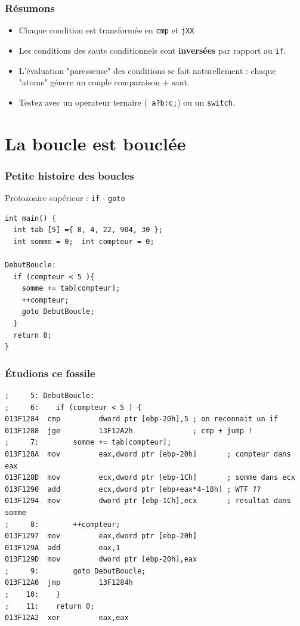 \documentclass{beamer}
\begin{document}
\begin{frame}
\frametitle{Résumons}
\begin{block}{}
\begin{itemize}
\item Chaque condition est transformée en \texttt{cmp} et \texttt{jXX}
\item Les conditions des sauts conditionnels sont \textbf{inversées} par rapport au \texttt{if}.
\item L'évaluation "paresseuse" des conditions se fait naturellement : chaque "atome" génere un couple comparaison + saut.
\item Testez avec un operateur ternaire (\texttt{ a?b:c;}) ou un \lstinline+switch+.
\end{itemize}
\end{block}

\end{frame}



\section{La boucle est bouclée}
\begin{frame}[fragile]
\frametitle{Petite histoire des boucles}
Protozoaire supérieur : \lstinline+if+ - \lstinline+goto+
\begin{lstlisting}
int main() {
  int tab [5] ={ 8, 4, 22, 904, 30 };
  int somme = 0;  int compteur = 0;

DebutBoucle:
  if (compteur < 5 ){
    somme += tab[compteur];
    ++compteur;
    goto DebutBoucle;
  }
  return 0;
}
\end{lstlisting}
\end{frame}

\begin{frame}[fragile]
\frametitle{Étudions ce fossile}
\begin{lstlisting}[language={[x86masm]Assembler}, basicstyle={\scriptsize\ttfamily}]
;     5: DebutBoucle:
;     6: 	if (compteur < 5 ) {
013F1284  cmp         dword ptr [ebp-20h],5 ; on reconnait un if
013F1288  jge         13F12A2h              ; cmp + jump !
;     7: 		somme += tab[compteur];
013F128A  mov         eax,dword ptr [ebp-20h]       ; compteur dans eax
013F128D  mov         ecx,dword ptr [ebp-1Ch]       ; somme dans ecx
013F1290  add         ecx,dword ptr [ebp+eax*4-18h] ; WTF ?? 
013F1294  mov         dword ptr [ebp-1Ch],ecx       ; resultat dans somme
;     8: 		++compteur;
013F1297  mov         eax,dword ptr [ebp-20h]  
013F129A  add         eax,1  
013F129D  mov         dword ptr [ebp-20h],eax  
;     9: 		goto DebutBoucle;
013F12A0  jmp         13F1284h  
;    10: 	}
;    11: 	return 0;
013F12A2  xor         eax,eax  
\end{lstlisting}
\end{frame}
\end{document}
